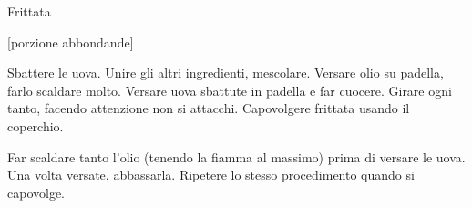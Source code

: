 \begin{recipe}{Frittata}
    \begin{header}
        [porzione abbondande]

    \end{header}
    
    \begin{ingredients}

    \end{ingredients}
    
    \begin{preparation}
        \step Sbattere le uova.
        \step Unire gli altri ingredienti, mescolare.
        \step Versare olio su padella, farlo scaldare molto.
        \step Versare uova sbattute in padella e far cuocere.
        \step Girare ogni tanto, facendo attenzione non si attacchi.
        \step Capovolgere frittata usando il coperchio.
    \end{preparation}
    
    \begin{suggestion}
        \suggestionMark Far scaldare tanto l'olio (tenendo la fiamma al massimo) prima di versare le uova.
            Una volta versate, abbassarla. Ripetere lo stesso procedimento quando si capovolge.
    \end{suggestion}
    
\end{recipe}
